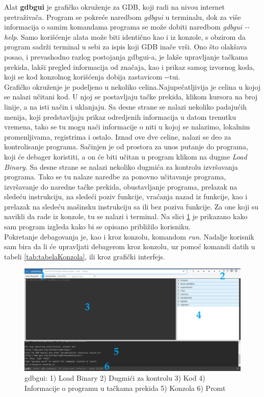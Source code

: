 \documentclass[a4paper]{article}
\begin{document}
Alat \textbf{gdbgui} je grafičko okruženje za GDB, koji radi na nivou internet pretraživača.
Program se pokreće naredbom \textit{gdbgui} u terminalu, dok za više informacija o samim komandama
programa se može dobiti naredbom \textit{gdbgui -\phantom{}-help}\cite{gdbgui}. Samo korišćenje alata može biti
identično kao i iz konzole, s obzirom da program sadrži terminal u sebi za ispis koji GDB inače vrši. Ono 
što olakšava posao, i prevashodno razlog postojanja gdbgui-a, je lakše upravljanje tačkama prekida,
lakši pregled informacija od značaja, kao i prikaz samog izvornog koda, koji se kod konzolnog korišćenja 
dobija zastavicom -\phantom{}-tui. \\
Grafičko okruženje je podeljeno u nekoliko celina.Najupečatljivija je celina u kojoj se nalazi učitani kod. 
U njoj se postavljaju tačke prekida, klikom kursora na broj linije, a na isti način i uklanjaju.
Sa desne strane se nalazi nekoliko padajućih menija, koji predstavljaju prikaz odredjenih informacija 
u datom trenutku vremena, tako se tu mogu naći informacije o niti u kojoj se nalazimo, lokalnim promenljivama, 
registrima i ostalo. Iznad ove dve celine, nalazi se deo za kontrolisanje programa. Sačinjen je od prostora
za unos putanje do programa, koji će debager koristiti, a on će biti učitan u program klikom na dugme 
\textit{Load Binary}. Sa desne strane se nalazi nekoliko dugmića za kontrolu izvršavanja programa.
Tako se tu nalaze naredbe za ponovno učitavanje programa, izvršavanje do naredne tačke prekida, obustavljanje
programa, prelazak na sledeću instrukciju, na sledeći poziv funkcije, vraćanja nazad iz funkcije, kao i prelazak
na sledeću mašinsku instrukciju sa ili bez poziva funkcije. Za one koji su navikli da rade iz konzole, tu se nalazi 
i terminal. Na slici \ref{fig:gdbgui} je prikazano kako sam program izgleda kako bi se opisano približilo korisniku.\\
Pokretanje debagovanja je, kao i kroz konzolu, komandom \textit{run}. Nadalje korisnik sam bira da li će 
upravljati debagerom kroz konzolu, uz pomoć komandi datih u tabeli \ref{tab:tabelaKonzola}, ili kroz grafički interfejs.

\begin{figure}[h!]
\begin{center}
\includegraphics[scale=0.2]{gdbgui.png}
\end{center}
\caption{gdbgui: 1) Load Binary 2) Dugmići za kontrolu 3) Kod 4) Informacije o programu u tačkama prekida 5) Konzola 6) Promt}
\label{fig:gdbgui}
\end{figure}
\end{document}
